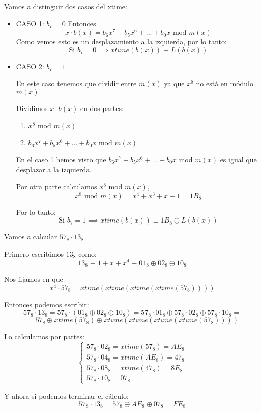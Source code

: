  Vamos a distinguir dos casos del xtime:
 \begin{itemize}
 	\item CASO 1: $b_7 =0$
 	Entonces
 	$$x \cdot b(x) = b_6x^7 + b_5x^6 +...+ b_0x \text{ mod }m(x)  $$
 	Como vemos esto es un desplazamiento a la izquierda, por lo tanto:
 	$$\text{Si } b_7=0 \implies xtime(b(x)) \equiv L(b(x))$$
 	
 	\item CASO 2: $b_7 = 1$
 	
 	En este caso tenemos que dividir entre $m(x)$ ya que $x^8$ no está en módulo $m(x)$
 	
 	Dividimos $x\cdot b(x)$ en dos partes:
 	\begin{enumerate}
 		\item $x^8$ mod $m(x)$
 		\item $b_6x^7 + b_5x^6 +...+ b_0x$ mod $m(x)$
 	\end{enumerate}
 	
 	En el caso 1 hemos visto que $b_6x^7 + b_5x^6 +...+ b_0x$ mod $m(x)$ es igual que desplazar a la izquierda.
 	
 	Por otra parte calculamos $x^8$ mod $m(x)$,
 	$$x^8 \text{ mod } m(x) = x^4 + x^3 + x + 1 = 1B_8$$
 	
 	Por lo tanto:
 		$$\text{Si } b_7=1 \implies xtime(b(x)) \equiv 1B_8 \oplus L(b(x))$$
 \end{itemize}
 
 \begin{example}
 	Vamos a calcular $57_8 \cdot 13_8$
 	
 	Primero escribimos $13_8$ como:
 	$$13_8 \equiv 1 + x + x^4 \equiv 01_8 \oplus 02_8 \oplus 10_8$$
 	
 	Nos fijamos en que 
 	$$x^4 \cdot 57_8 = xtime(xtime(xtime(xtime(57_8))))$$
 	
 	Entonces podemos escribir:
 	$$57_8 \cdot 13_8 = 57_8 \cdot (01_8 \oplus 02_8 \oplus 10_8) = 57_8 \cdot 01_8 \oplus 57_8 \cdot 02_8 \oplus 57_8 \cdot 10_8 = $$
 	$$= 57_8 \oplus xtime(57_8) \oplus xtime(xtime(xtime(xtime(57_8))))$$
 	
 	Lo calculamos por partes:
 	$$\begin{cases}
	 	57_8 \cdot 02_8 = xtime(57_8) = AE_8\\
	 	57_8 \cdot 04_8 = xtime(AE_8) = 47_8\\
	 	57_8 \cdot 08_8 = xtime(47_8) = 8E_8\\
	 	57_8 \cdot 10 _8 = 07_8
 	\end{cases}$$
 	
 	Y ahora si podemos terminar el cálculo:
 	$$57_8 \cdot 13_8 = 57_8 \oplus AE_8 \oplus 07_8 = FE_8$$
 \end{example}
 
